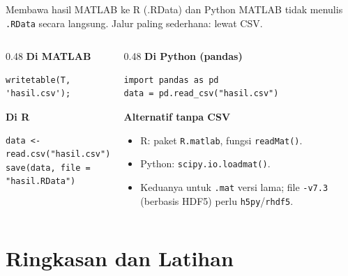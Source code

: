 \documentclass[10pt,aspectratio=169]{beamer}
\newcommand{\kode}[1]{\texttt{\small #1}}
\begin{document}
\begin{frame}[fragile]{Membawa hasil MATLAB ke R (.RData) dan Python}
  MATLAB tidak menulis \kode{.RData} secara langsung. Jalur paling sederhana: \alert{lewat CSV}.
  \vspace{0.2em}
  \begin{columns}[T]
    \begin{column}{0.48\textwidth}
      \textbf{Di MATLAB}
\begin{lstlisting}
writetable(T, 'hasil.csv');
\end{lstlisting}
      \textbf{Di R}
\begin{lstlisting}[style=plain]
data <- read.csv("hasil.csv")
save(data, file = "hasil.RData")
\end{lstlisting}
    \end{column}
    \begin{column}{0.48\textwidth}
      \textbf{Di Python (pandas)}
\begin{lstlisting}[style=plain]
import pandas as pd
data = pd.read_csv("hasil.csv")
\end{lstlisting}
      \textbf{Alternatif tanpa CSV}
      \begin{itemize}\small
        \item R: paket \kode{R.matlab}, fungsi \kode{readMat()}.
        \item Python: \kode{scipy.io.loadmat()}.
        \item Keduanya untuk \kode{.mat} versi lama; file \kode{-v7.3} (berbasis HDF5) perlu \kode{h5py}/\kode{rhdf5}.
      \end{itemize}
    \end{column}
  \end{columns}
\end{frame}

\section{Ringkasan dan Latihan}
\end{document}
